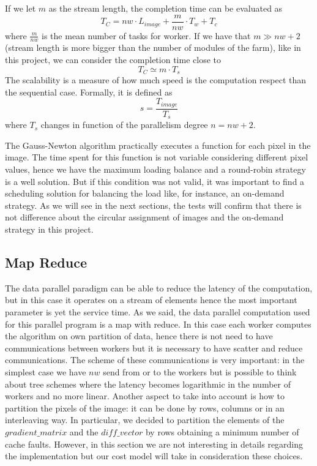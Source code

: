 If we let $m$ as the stream length, the completion time can be evaluated as
\[
T_{C} = nw \cdot L_{image} + \frac{m}{nw} \cdot T_{w} + T_{c} 
\]
where $\frac{m}{nw}$ is the mean number of tasks for worker.
If we have that $m \gg nw+2$ (stream length is more bigger than the number of modules of the farm), like in this project, we can consider the completion time close to
\begin{equation}
\label{completiontime}
T_{C} \simeq m \cdot T_{s}
\end{equation}
The scalability is a measure of how much speed is the computation respect than the sequential case. Formally, it is defined as
\begin{equation}
\label{scalability}
s = \frac{T_{image}}{T_{s}}
\end{equation}
where $T_{s}$ changes in function of the parallelism degree $n=nw+2$.

The Gauss-Newton algorithm practically executes a function for each pixel in the image. The time spent for this function is not variable considering different pixel values, hence we have the maximum loading balance and a round-robin strategy is a well solution. But if this condition was not valid, it was important to find a scheduling solution for balancing the load like, for instance, an on-demand strategy. As we will see in the next sections, the tests will confirm that there is not difference about the circular assignment of images and the on-demand strategy in this project.

\subsection{Map Reduce}

The data parallel paradigm can be able to reduce the latency of the computation, but in this case it operates on a stream of elements hence the most important parameter is yet the service time. As we said, the data parallel computation used for this parallel program is a map with reduce. In this case each worker computes the algorithm on own partition of data, hence there is not need to have communications between workers but it is necessary to have scatter and reduce communications. The scheme of these communications is very important: in the simplest case we have $nw$ send from or to the workers but is possible to think about tree schemes where the latency becomes logarithmic in the number of workers and no more linear. Another aspect to take into account is how to partition the pixels of the image: it can be done by rows, columns or in an interleaving way. In particular, we decided to partition the elements of the $gradient\_matrix$ and the $diff\_vector$ by rows obtaining a minimum number of cache faults. However, in this section we are not interesting in details regarding the implementation but our cost model will take in consideration these choices.

